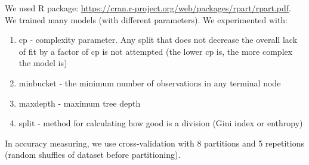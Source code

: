 \documentclass[a4paper]{article}
\begin{document}
\begin{multicols}{2}
We used R package: \url{https://cran.r-project.org/web/packages/rpart/rpart.pdf}.
We trained many models (with different parameters).
We experimented with:
\begin{enumerate}
    \item cp - complexity parameter.
        Any split that does not decrease the overall lack of fit by a factor of cp is not attempted
        (the lower cp is, the more complex the model is)
    \item minbucket - the minimum number of observations in any terminal node
    \item maxdepth - maximum tree depth
    \item split - method for calculating how good is a division (Gini index or enthropy)
\end{enumerate}
In accuracy measuring, we use cross-validation with 8 partitions
and 5 repetitions (random shuffles of dataset before partitioning).
% 
% 
% 
% 
% 
% 
% 
% 
% 

\end{multicols}
\end{document}

